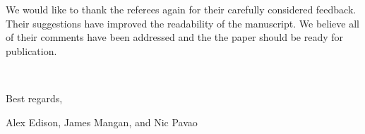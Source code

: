 \documentclass[notitlepage, 12pt]{revtex4-1}
\begin{document}
We would like to thank the referees again for their carefully considered feedback.
Their suggestions have improved the readability of the manuscript.
We believe all of their comments have been addressed and the the paper should be ready for publication.

\

Best regards,

Alex Edison, James Mangan, and Nic Pavao
\end{document}
